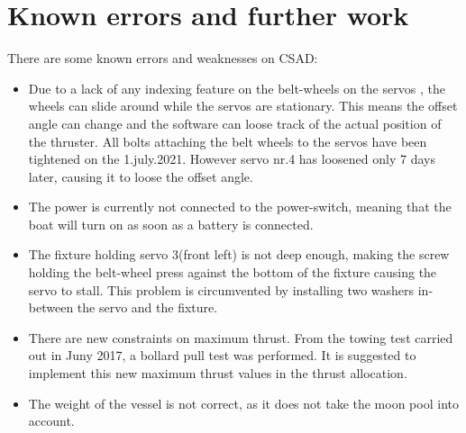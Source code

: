 \section*{Known errors and further work}
There are some known errors and weaknesses on CSAD: 
\begin{itemize}
	\item Due to a lack of any indexing feature on the belt-wheels on the servos , the wheels can slide around while the servos are stationary. This means the offset angle can change and the software can loose track of the actual position of the thruster.
	All bolts attaching the belt wheels to the servos have been tightened on the 1.july.2021. However servo nr.4 has loosened only 7 days later, causing it to loose the offset angle.
	\item The power is currently not connected to the power-switch, meaning that the boat will turn on as soon as a battery is connected.
	\item The fixture holding servo 3(front left) is not deep enough, making the screw holding the belt-wheel press against the bottom of the fixture causing the servo to stall. This problem is circumvented by installing two washers in-between the servo and the fixture.
	\item There are new constraints on maximum thrust. From the towing test carried out in Juny 2017, a bollard pull test was performed. It is suggested to implement this new maximum thrust values in the thrust allocation. 
	\item The weight of the vessel is not correct, as it does not take the moon pool into account. 
\end{itemize}